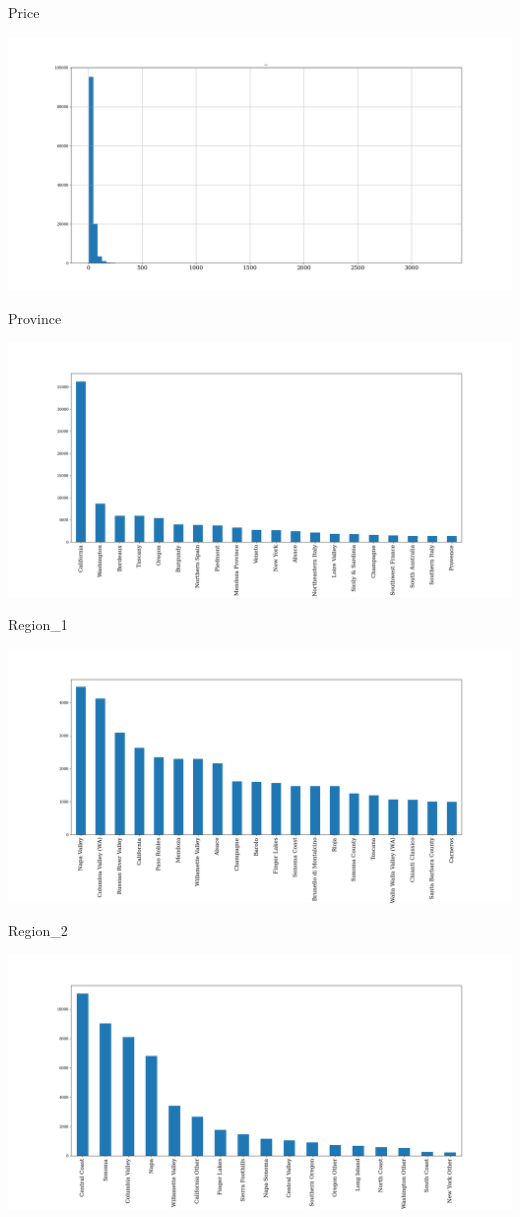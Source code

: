 \documentclass[11pt]{article}
\begin{document}
Price

\includegraphics[width=\textwidth,height=\textheight,keepaspectratio]{figures/1c_histogram_of_price.png}

Province

\includegraphics[width=\textwidth,height=\textheight,keepaspectratio]{figures/1c_histogram_of_province.png}

Region\_1

\includegraphics[width=\textwidth,height=\textheight,keepaspectratio]{figures/1c_histogram_of_region_1.png}

Region\_2

\includegraphics[width=\textwidth,height=\textheight,keepaspectratio]{figures/1c_histogram_of_region_2.png}
\end{document}
